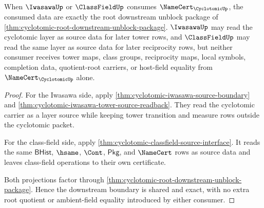 \begin{theorem}
\label{thm:cyclotomic-root-iwasawa-classfield-consumer-boundary}
When $\IwasawaUp$ or $\ClassFieldUp$ consumes $\NameCert_{\CyclotomicUp}$, the
consumed data are exactly the root downstream unblock package of
\autoref{thm:cyclotomic-root-downstream-unblock-package}.  $\IwasawaUp$ may read
the cyclotomic layer as source data for later tower rows, and $\ClassFieldUp$
may read the same layer as source data for later reciprocity rows, but neither
consumer receives tower maps, class groups, reciprocity maps, local symbols,
completion data, quotient-root carriers, or host-field equality from
$\NameCert_{\CyclotomicUp}$ alone.
\end{theorem}
\begin{proof}
For the Iwasawa side, apply \autoref{thm:cyclotomic-iwasawa-source-boundary}
and \autoref{thm:cyclotomic-iwasawa-tower-source-readback}.  They read the
cyclotomic carrier as a layer source while keeping tower transition and measure
rows outside the cyclotomic packet.

For the class-field side, apply
\autoref{thm:cyclotomic-classfield-source-interface}.  It reads the same
$\mathsf{BHist}$, $\hsame$, $\Cont$, $\mathsf{Pkg}$, and $\NameCert$ rows as
source data and leaves class-field operations to their own certificate.

Both projections factor through
\autoref{thm:cyclotomic-root-downstream-unblock-package}.  Hence the downstream
boundary is shared and exact, with no extra root quotient or ambient-field
equality introduced by either consumer.
\end{proof}
